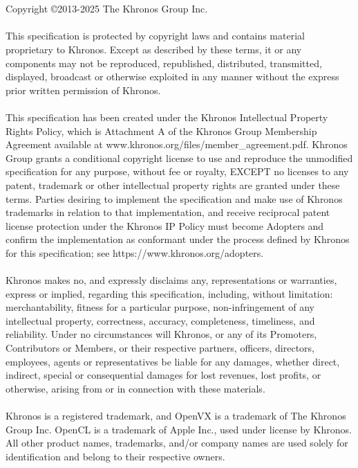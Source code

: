 \documentclass[twoside]{article}
\newcommand{\+}{\discretionary{\mbox{\scriptsize$\hookleftarrow$}}{}{}}
\begin{document}
  \begin{copyrightpage}
  \begin{center}%
  
  \end{center}
\\\\
Copyright \copyright 2013-2025 The Khronos Group Inc.
\\\\
This specification is protected by copyright laws and contains material
proprietary to Khronos.
Except as described by these terms, it or any components may not be
reproduced, republished, distributed, transmitted, displayed, broadcast or
otherwise exploited in any manner without the express prior written
permission of Khronos.
\\\\
This specification has been created under the Khronos Intellectual Property
Rights Policy, which is Attachment A of the Khronos Group Membership
Agreement available at www.khronos.org/files/member\_agreement.pdf.
Khronos Group grants a conditional copyright license to use and reproduce
the unmodified specification for any purpose, without fee or royalty, EXCEPT
no licenses to any patent, trademark or other intellectual property rights
are granted under these terms.
Parties desiring to implement the specification and make use of Khronos
trademarks in relation to that implementation, and receive reciprocal patent
license protection under the Khronos IP Policy must become Adopters and
confirm the implementation as conformant under the process defined by
Khronos for this specification; see https://www.khronos.org/adopters.
\\\\
Khronos makes no, and expressly disclaims any, representations or
warranties, express or implied, regarding this specification, including,
without limitation: merchantability, fitness for a particular purpose,
non-infringement of any intellectual property, correctness, accuracy,
completeness, timeliness, and reliability.
Under no circumstances will Khronos, or any of its Promoters, Contributors
or Members, or their respective partners, officers, directors, employees,
agents or representatives be liable for any damages, whether direct,
indirect, special or consequential damages for lost revenues, lost profits,
or otherwise, arising from or in connection with these materials.
\\\\
Khronos is a registered trademark, and OpenVX is a trademark of The Khronos
Group Inc.
OpenCL is a trademark of Apple Inc., used under license by Khronos.
All other product names, trademarks, and/or company names are used solely
for identification and belong to their respective owners.
  \end{copyrightpage}

  \clearpage

  \hypersetup{pageanchor=true}

\end{document}
